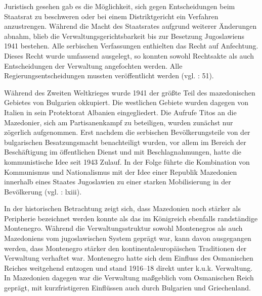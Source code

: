 Juristisch gesehen gab es die Möglichkeit, sich gegen Entscheidungen beim Staatsrat zu beschweren oder bei einem Distriktgericht ein Verfahren anzustrengen. Während die Macht des Staatsrates aufgrund weiterer Änderungen abnahm, blieb die Verwaltungsgerichtsbarkeit bis zur Besetzung Jugoslawiens 1941 bestehen. Alle serbischen Verfassungen enthielten das Recht auf Anfechtung. Dieses Recht wurde umfassend ausgelegt, so konnten sowohl Rechtsakte als auch Entscheidungen der Verwaltung angefochten werden. Alle Regierungsentscheidungen mussten veröffentlicht werden (vgl. \cite{sevic}: 51).\par

Während des Zweiten Weltkrieges wurde 1941 der größte Teil des mazedonischen Gebietes von Bulgarien okkupiert. Die westlichen Gebiete wurden dagegen von Italien in sein Protektorat Albanien eingegliedert. Die Aufrufe Titos an die Mazedonier, sich am Partisanenkampf zu beteiligen, wurden zunächst nur zögerlich aufgenommen. Erst nachdem die serbischen Bevölkerungsteile von der bulgarischen Besatzungsmacht benachteiligt wurden, vor allem im Bereich der Beschäftigung im öffentlichen Dienst und mit Beschlagnahmungen, hatte die kommunistische Idee seit 1943 Zulauf. In der Folge führte die Kombination von Kommunismus und Nationalismus mit der Idee einer Republik Mazedonien innerhalb eines Staates Jugoslawien zu einer starken Mobilisierung in der Bevölkerung (vgl. \cite{bech09}: lxiii).\par

In der historischen Betrachtung zeigt sich, dass Mazedonien noch stärker als Peripherie bezeichnet werden konnte als das im Königreich ebenfalls randständige Montenegro. Während die Verwaltungsstruktur sowohl Montenegros als auch Mazedoniens vom jugoslawischen System geprägt war, kann davon ausgegangen werden, dass Montenegro stärker den kontinentaleuropäischen Traditionen der Verwaltung verhaftet war. Montenegro hatte sich dem Einfluss des Osmanischen Reiches weitgehend entzogen und stand 1916–18 direkt unter k.u.k. Verwaltung. In Mazedonien dagegen war die Verwaltung maßgeblich vom Osmanischen Reich geprägt, mit kurzfristigeren Einflüssen auch durch Bulgarien und Griechenland.\par

